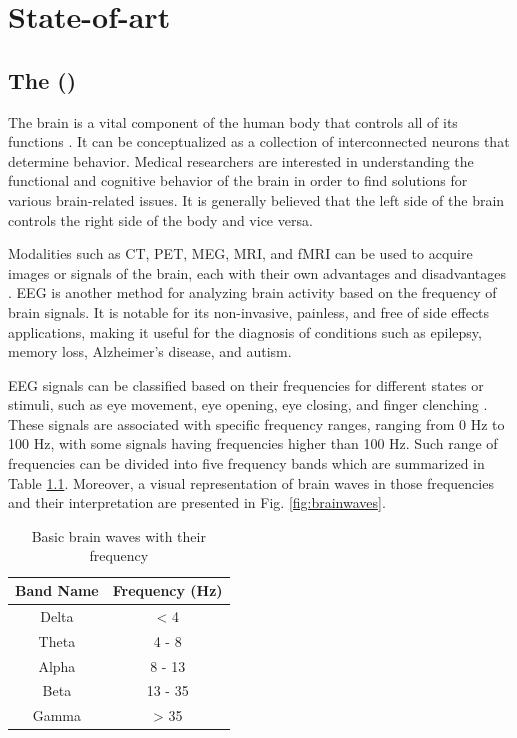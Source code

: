 \chapter{State-of-art}
\section{The  ()}
The brain is a vital component of the human body that controls all of its functions \cite{kumar_analysis_2012}. It can be conceptualized as a collection of interconnected neurons that determine behavior. Medical researchers are interested in understanding the functional and cognitive behavior of the brain in order to find solutions for various brain-related issues. It is generally believed that the left side of the brain controls the right side of the body and vice versa. 

Modalities such as \gls{CT}, \gls{PET}, \gls{MEG}, \gls{MRI}, and \gls{fMRI} can be used to acquire images or signals of the brain, each with their own advantages and disadvantages \cite{hajare_comparative_2021}. \gls{EEG} is another method for analyzing brain activity based on the frequency of brain signals. It is notable for its non-invasive, painless, and free of side effects applications, making it useful for the diagnosis of conditions such as epilepsy, memory loss, Alzheimer's disease, and autism. 

EEG signals can be classified based on their frequencies for different states or stimuli, such as eye movement, eye opening, eye closing, and finger clenching \cite{kumar_analysis_2012}. These signals are associated with specific frequency ranges, ranging from 0 Hz to 100 Hz, with some signals having frequencies higher than 100 Hz. Such range of frequencies can be divided into five frequency bands which are summarized in Table \ref{tab:brain-frequency}. Moreover, a visual representation of brain waves in those frequencies and their interpretation are presented in Fig. \ref{fig:brainwaves}.


\begin{table}[ht]
    \centering
    \begin{tabular}{cc}
    \hline
    \textbf{Band Name} & \textbf{Frequency (Hz)}    \\ \hline
    Delta              & \textless{} 4              \\
    Theta              & 4 - 8                      \\
    Alpha              & 8 - 13                     \\
    Beta               & 13 - 35                    \\
    Gamma              & \textgreater{} 35          \\ \hline
    \end{tabular}
    \caption{Basic brain waves with their frequency \cite{jiang_removal_2019, abhang_chapter_2016}}
    \label{tab:brain-frequency}
\end{table}


